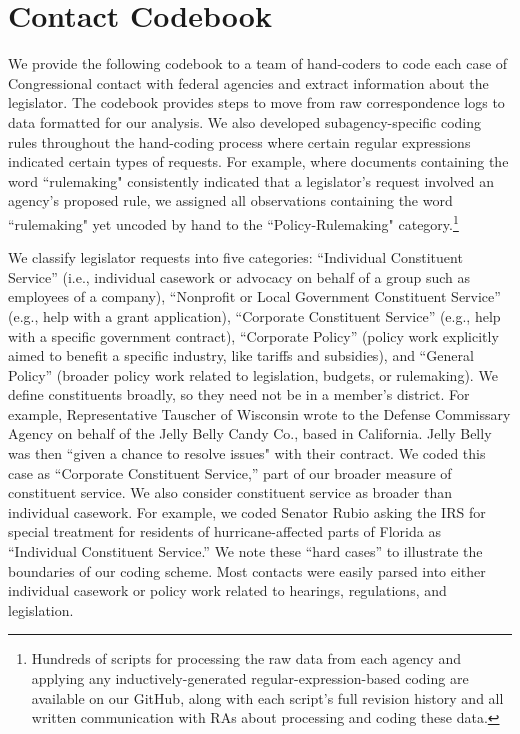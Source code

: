 %





\section{Contact Codebook} \label{a:codebook}
\singlespacing

We provide the following codebook to a team of hand-coders to code each case of Congressional contact with federal agencies and extract information about the legislator. The codebook provides steps to move from raw correspondence logs to data formatted for our analysis.  We also developed subagency-specific coding rules throughout the hand-coding process where certain regular expressions indicated certain types of requests. For example, where documents containing the word ``rulemaking" consistently indicated that a legislator's request involved an agency's proposed rule, we assigned all observations containing the word ``rulemaking" yet uncoded by hand to the ``Policy-Rulemaking" category.\footnote{Hundreds of scripts for processing the raw data from each agency and applying any inductively-generated regular-expression-based coding are available on our GitHub, along with each script's full revision history and all written communication with RAs about processing and coding these data.}

We classify legislator requests into five categories: ``Individual Constituent Service'' (i.e., individual casework or advocacy on behalf of a group such as employees of a company), ``Nonprofit or Local Government Constituent Service'' (e.g., help with a grant application), ``Corporate Constituent Service'' (e.g., help with a specific government contract), ``Corporate Policy'' (policy work explicitly aimed to benefit a specific industry, like tariffs and subsidies), and ``General Policy'' (broader policy work related to legislation, budgets, or rulemaking). We define constituents broadly, so they need not be in a member's district. For example, Representative Tauscher of Wisconsin wrote to the Defense Commissary Agency on behalf of the Jelly Belly Candy Co., based in California. Jelly Belly was then ``given a chance to resolve issues" with their contract. We coded this case as ``Corporate Constituent Service,'' part of our broader measure of constituent service. We also consider constituent service as broader than individual casework. For example, we coded Senator Rubio asking the IRS for special treatment for residents of hurricane-affected parts of Florida as ``Individual Constituent Service.'' We note these ``hard cases'' to illustrate the boundaries of our coding scheme. Most contacts were easily parsed into either individual casework or policy work related to hearings, regulations, and legislation.

